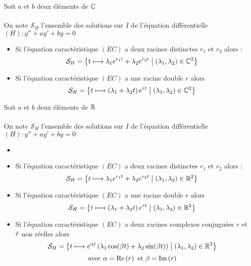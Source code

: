 \begin{defprop}[Ensemble des solutions dans le cas où \(\K = \C\)]
    Soit \(a\) et \(b\) deux éléments de \(\mathbb{C}\)\\~\\
    On note \(\mathcal{S}_H\) l’ensemble des solutions sur \(I\) de l’équation différentielle \((H) : y'' + ay' + by = 0\)
    \begin{itemize}
        \item Si l'équation caractéristique \((EC)\) a deux racines distinctes \(r_1\) et \(r_2\) alors : 
        \[\mathcal{S}_H = \left\lbrace t \longmapsto \lambda_1 e^{r_1 t} + \lambda_2 e^{r_2 t} \;\middle|\; \left(\lambda_1,\lambda_2\right) \in \mathbb{C}^2\right\rbrace\]
        \item Si l'équation caractéristique \((EC)\) a une racine double \(r\) alors 
        \[\mathcal{S}_H = \left\lbrace t \longmapsto \left(\lambda_1 + \lambda_2  t \right)e^{r t} \;\middle|\; \left(\lambda_1,\lambda_2\right) \in \mathbb{C}^2\right\rbrace\]
    \end{itemize}

\end{defprop}
\begin{defprop}[Ensemble des solutions dans le cas où \(\K = \R\)]
    Soit \(a\) et \(b\) deux éléments de \(\mathbb{R}\)\\~\\
    On note \(\mathcal{S}_H\) l’ensemble des solutions sur \(I\) de l’équation différentielle \((H) : y'' + ay' + by = 0\)
    \begin{itemize}
        \item \item Si l'équation caractéristique \((EC)\) a deux racines distinctes \(r_1\) et \(r_2\) alors : 
        \[\mathcal{S}_H = \left\lbrace t \longmapsto \lambda_1 e^{r_1 t} + \lambda_2 e^{r_2 t} \;\middle|\; \left(\lambda_1,\lambda_2\right) \in \mathbb{R}^2\right\rbrace\]
        \item Si l'équation caractéristique \((EC)\) a une racine double \(r\) alors 
        \[\mathcal{S}_H = \left\lbrace t \longmapsto \left(\lambda_1 + \lambda_2  t \right)e^{r t} \;\middle|\; \left(\lambda_1,\lambda_2\right) \in \mathbb{R}^2\right\rbrace\]
        \item Si l'équation caractéristique \((EC)\) a deux racines complexes conjuguées \(r\) et \(\overline{r}\) non réelles alors
        \[\mathcal{S}_H = \left\lbrace t \longmapsto e^{\alpha t}\left(\lambda_1 \cos (\beta t) + \lambda_2 \sin (\beta t)\right)\;\middle|\; \left(\lambda_1,\lambda_2\right) \in \mathbb{R}^2\right\rbrace\]
        \[\text{avec } \alpha = \operatorname{Re}\left(r\right) \text{ et } \beta = \operatorname{Im}\left(r\right)\]

    \end{itemize}
\end{defprop}

